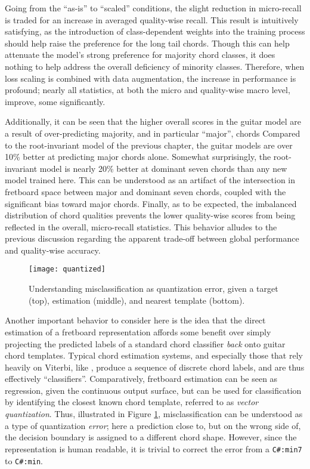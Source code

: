 Going from the ``as-is'' to ``scaled'' conditions, the slight reduction in micro-recall is traded for an increase in averaged quality-wise recall.
This result is intuitively satisfying, as the introduction of class-dependent weights into the training process should help raise the preference for the long tail chords.
Though this can help attenuate the model's strong preference for majority chord classes, it does nothing to help address the overall deficiency of minority classes.
Therefore, when loss scaling is combined with data augmentation, the increase in performance is profound; nearly all statistics, at both the micro and quality-wise macro level, improve, some significantly.

Additionally, it can be seen that the higher overall scores in the guitar model are a result of over-predicting majority, and in particular ``major'', chords
Compared to the root-invariant model of the previous chapter, the guitar models are over 10\% better at predicting major chords alone.
Somewhat surprisingly, the root-invariant model is nearly 20\% better at dominant seven chords than any new model trained here.
This can be understood as an artifact of the intersection in fretboard space between major and dominant seven chords, coupled with the significant bias toward major chords.
Finally, as to be expected, the imbalanced distribution of chord qualities prevents the lower quality-wise scores from being reflected in the overall, micro-recall statistics.
This behavior alludes to the previous discussion regarding the apparent trade-off between global performance and quality-wise accuracy.


\begin{figure}[t!]
  \centering
  \centerline{\texttt{[image: quantized]}}
\caption{Understanding misclassification as quantization error, given a target (top), estimation (middle), and nearest template (bottom).}
\label{fig:quantized}
%
\end{figure}


Another important behavior to consider here is the idea that the direct estimation of a fretboard representation affords some benefit over simply projecting the predicted labels of a standard chord classifier \emph{back} onto guitar chord templates.
Typical chord estimation systems, and especially those that rely heavily on Viterbi, like \cite{Cho2014}, produce a sequence of discrete chord labels, and are thus effectively ``classifiers''.
Comparatively, fretboard estimation can be seen as regression, given the continuous output surface, but can be used for classification by identifying the closest known chord template, referred to as \emph{vector quantization}.
Thus, illustrated in Figure \ref{fig:quantized}, misclassification can be understood as a type of quantization \emph{error};
here a prediction close to, but on the wrong side of, the decision boundary is assigned to a different chord shape.
However, since the representation is human readable, it is trivial to correct the error from a \texttt{C\#:min7} to \texttt{C\#:min}.


